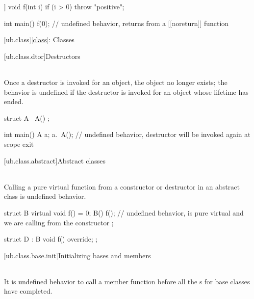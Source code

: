\pnum
\begin{example}
\begin{codeblock}
[[noreturn]] void f(int i) {
  if (i > 0)
    throw "positive";
}

int main() {
  f(0);         // undefined behavior, returns from a [[noreturn]] function
}
\end{codeblock}
\end{example}


[ub.class]{\ref{class}: Classes}

[ub.class.dtor]{Destructors}

\pnum
{} \\
Once a destructor is invoked for an object, the object no longer exists; the behavior is undefined if the
destructor is invoked for an object whose lifetime has ended.

\pnum
\begin{example}
\begin{codeblock}
struct A {
  ~A() {}
};

int main() {
  A a;
  a.~A();       // undefined behavior, destructor will be invoked again at scope exit
}
\end{codeblock}
\end{example}


[ub.class.abstract]{Abstract classes}

\pnum
{} \\
Calling a pure virtual function from a constructor or destructor in an abstract class is undefined behavior.

\pnum
\begin{example}
\begin{codeblock}
struct B {
  virtual void f() = 0;
  B() {
    f();        // undefined behavior,  is pure virtual and we are calling from the constructor
  }
};

struct D : B {
  void f() override;
};
\end{codeblock}
\end{example}


[ub.class.base.init]{Initializing bases and members}

\pnum
{} \\
It is undefined behavior to call a member function before all the s for base classes have completed.


